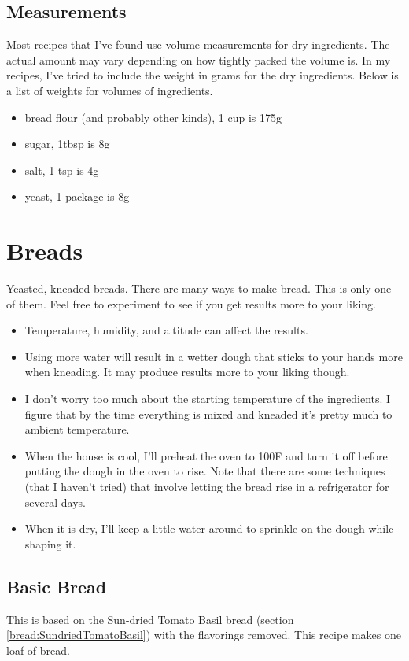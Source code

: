 \documentclass[10pt, openany]{book}
\begin{document}
\section{Measurements}
Most recipes that I've found use volume measurements for dry ingredients.  The actual amount may vary depending on how tightly packed the volume is.  In my recipes, I've tried to include the weight in grams for the dry ingredients.  Below is a list of weights for volumes of ingredients.
\begin{itemize}
  \item bread flour (and probably other kinds), 1 cup is 175g
  \item sugar, 1tbsp is 8g
  \item salt, 1 tsp is 4g
  \item yeast, 1 package is 8g
\end{itemize}

\chapter{Breads}
Yeasted, kneaded breads.  There are many ways to make bread.  This is only one of them.  Feel free to experiment to see if you get results more to your liking.
\begin{itemize}
  \item Temperature, humidity, and altitude can affect the results.
  \item Using more water will result in a wetter dough that sticks to your hands more when kneading.  It may produce results more to your liking though.
  \item I don't worry too much about the starting temperature of the ingredients.  I figure that by the time everything is mixed and kneaded it's pretty much to ambient temperature.
  \item When the house is cool, I'll preheat the oven to 100\degree{}F and turn it off before putting the dough in the oven to rise.  Note that there are some techniques (that I haven't tried) that involve letting the bread rise in a refrigerator for several days.
  \item When it is dry, I'll keep a little water around to sprinkle on the dough while shaping it.
\end{itemize}

\section{Basic Bread}
\label{bread:Basic}
This is based on the Sun-dried Tomato Basil bread (section \ref{bread:SundriedTomatoBasil}) with the flavorings removed.  This recipe makes one loaf of bread.
\end{document}
